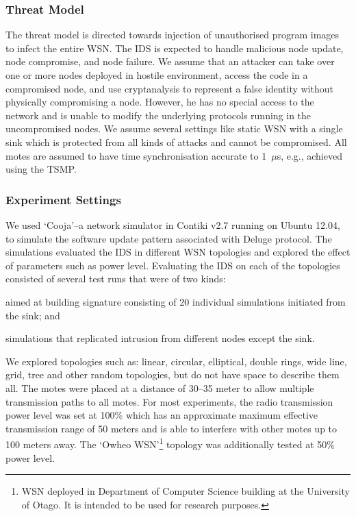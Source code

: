\documentclass[conference]{IEEEtran}
\begin{document}
\subsubsection*{Threat Model}
The threat model is directed towards injection of unauthorised program images to infect the entire WSN.
The IDS is expected to handle malicious node update, node compromise, and node failure.
We assume that an  attacker  can take over one or more nodes deployed in hostile environment, access the code in a compromised node, and use cryptanalysis to represent a false identity without physically compromising a node.
However, he has  no special  access to  the  network and is unable to modify the underlying protocols running in the uncompromised nodes.
We assume several settings like static WSN with a single  sink which is  protected from all kinds of attacks and cannot be compromised. All motes are assumed to have time synchronisation accurate to 1~$\mu$s, e.g., achieved using the TSMP.%
\subsubsection*{Experiment Settings}
\label{subsec:sim_env} 
We used `Cooja'--a%
 network simulator in Contiki v2.7 running on Ubuntu 12.04, to simulate the software update pattern associated with Deluge protocol.
The simulations evaluated the IDS in different WSN topologies and explored the effect of parameters such as power level.
Evaluating the IDS on each of the topologies consisted of several test runs that  were of two kinds: 
\begin{inparaenum}
\item aimed at building signature consisting of 20 individual simulations initiated from the sink; and
\item simulations that replicated intrusion from different nodes except the sink.
\end{inparaenum}
We explored topologies such as: linear, circular, elliptical, double rings, wide line, grid, tree and other random topologies, but do not have space to describe them all.
The motes were placed at a distance of 30--35 meter to allow  multiple transmission paths to all motes. 
For most experiments, the radio transmission power level was set at 100\% which has an approximate maximum effective transmission range of 50 meters and is able to interfere with other motes up to 100 meters away.
The `Owheo WSN'\footnote{WSN deployed in Department of Computer Science building at the University of Otago. It is intended to be used for research purposes.} topology was additionally tested at 50\% power level.%
\end{document}
